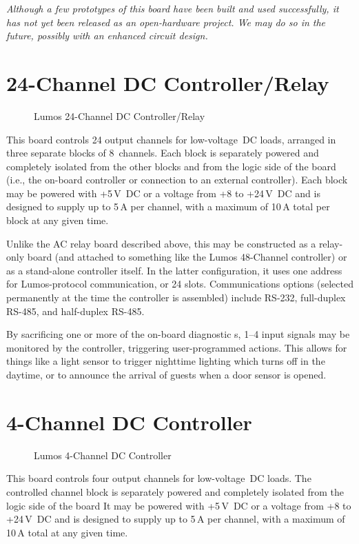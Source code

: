 \documentclass[letterpaper,twoside,onecolumn,openright,final]{memoir}
\begin{document}
\emph{Although a few prototypes of this board have been built and used successfully, it has not yet been
released as an open-hardware project.  We may do so in the future, possibly with an enhanced circuit
design.}
\section{24-Channel DC Controller/Relay}
\begin{figure}
  \begin{center}
  \end{center}
  \caption{Lumos 24-Channel DC Controller/Relay}
\end{figure}
This board controls 24 output channels for low-voltage~DC loads, arranged in three separate blocks 
of 8~channels.  Each block is separately powered and completely isolated from the other blocks and 
from the logic side of the board (i.e., the on-board controller or connection to an external
controller).  Each block may be powered with +5\,V~DC or a voltage from +8 to +24\,V~DC and
is designed to supply up to 5\,A per channel, with a maximum of 10\,A total per block at any 
given time.

Unlike the AC relay board described above, this may be constructed as a relay-only board (and attached
to something like the Lumos 48-Channel controller) or as a stand-alone controller itself.  In the latter
configuration, it uses one address for Lumos-protocol communication, or 24  slots.
Communications options (selected permanently at the time the controller is assembled) include
RS-232, full-duplex RS-485, and half-duplex RS-485.

By sacrificing one or more of the on-board diagnostic s, 1--4 input signals may be 
monitored by the controller, triggering user-programmed actions.  This allows for things like
a light sensor to trigger nighttime lighting which turns off in the daytime, or to announce the
arrival of guests when a door sensor is opened.

\section{4-Channel DC Controller}
\begin{figure}
  \begin{center}
  \end{center}
  \caption{Lumos 4-Channel DC Controller}
\end{figure}
This board controls four output channels for low-voltage~DC loads.
The controlled channel block is separately powered and completely isolated from the
logic side of the board 
It may be powered with +5\,V~DC or a voltage from +8 to +24\,V~DC and
is designed to supply up to 5\,A per channel, with a maximum of 10\,A total at any 
given time.
\end{document}
